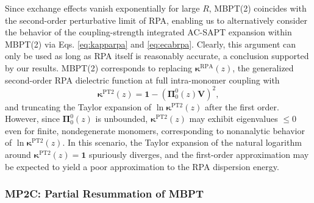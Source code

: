 \documentclass[journal=jctcce,manuscript=article]{achemso}
\begin{document}
Since exchange effects vanish
exponentially for large $R$, MBPT(2) coincides with the second-order
perturbative limit of RPA, enabling us to alternatively consider the
behavior of the coupling-strength integrated AC-SAPT expansion within
MBPT(2) via Eqs. \eqref{eq:kapparpa} and \eqref{eq:ecabrpa}. Clearly,
this argument can only be used as long as RPA itself is reasonably
accurate, a conclusion supported by our results. MBPT(2) corresponds to
replacing $\boldsymbol{\kappa}^{\text{RPA}}(z)$, the generalized
second-order RPA dielectric 
function at full intra-monomer coupling with
\begin{equation}
  \boldsymbol{\kappa}^{\text{PT2}}(z) =  \mathbf{1} - \left(
    \boldsymbol{\Pi}_{0}^0(z)  
    \mathbf{V} \right)^2,
\end{equation}
and truncating the Taylor expansion of $\ln
\boldsymbol{\kappa}^{\text{PT2}}(z)$ after the first order. However,
since $\boldsymbol{\Pi}_{0}^0(z)$ is unbounded,
$\boldsymbol{\kappa}^{\text{PT2}}(z)$ 
may exhibit eigenvalues $\leq 0$ even for finite, nondegenerate monomers,
corresponding to nonanalytic behavior of 
$\ln \boldsymbol{\kappa}^{\text{PT2}}(z)$. In this scenario, the Taylor
expansion of the natural logarithm around
$\boldsymbol{\kappa}^{\text{PT2}}(z) = \mathbf{1}$ spuriously diverges,
and the first-order approximation may be expected to yield a poor
approximation to the RPA dispersion energy. 

\subsubsection{MP2C: Partial Resummation of MBPT}
\end{document}
